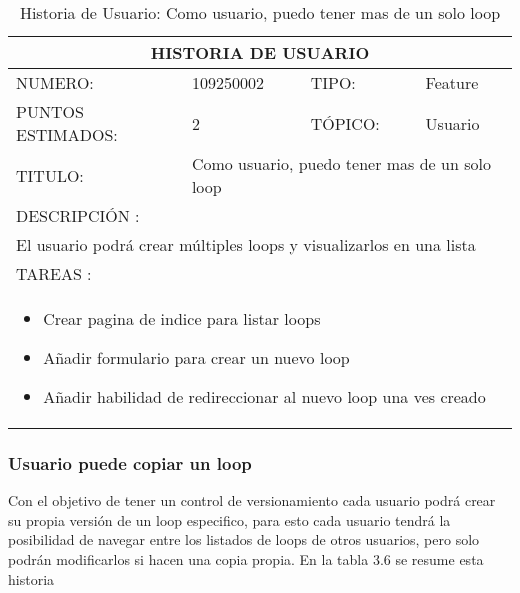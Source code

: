 \begin{table}[h]
\centering
\renewcommand{\arraystretch}{1.4}
\begin{tabular}{|*{4}{l|}}
\hline
\multicolumn{4}{|c|}{HISTORIA DE USUARIO} \\ \hline
NUMERO: & 109250002 & TIPO: & Feature \\ \hline
PUNTOS ESTIMADOS: & 2 & TÓPICO: & Usuario \\ \hline
TITULO: & \multicolumn{3}{|p{7.2cm}|}{Como usuario, puedo tener mas de un solo loop} \\ \hline
\multicolumn{4}{|l|}{DESCRIPCIÓN : } \\ \hline
\multicolumn{4}{|p{11cm}|}{El usuario podrá crear múltiples loops y visualizarlos en una lista} \\ \hline
\multicolumn{4}{|l|}{TAREAS : } \\ \hline
\multicolumn{4}{|p{11cm}|}{
\begin{minipage}[t]{\hsize}
  \begin{itemize}
    \item Crear pagina de indice para listar loops
    \item Añadir formulario para crear un nuevo loop
    \item Añadir habilidad de redireccionar al nuevo loop una ves creado
  \end{itemize}
\end{minipage}
} \\ \hline
\end{tabular}
\caption{Historia de Usuario: Como usuario, puedo tener mas de un solo loop}
\label{tab:Primero}
\end{table}

\subsubsection{Usuario puede copiar un loop}

Con el objetivo de tener un control de versionamiento cada usuario podrá
crear su propia versión de un loop especifico, para esto cada usuario
tendrá la posibilidad de navegar entre los listados de loops de otros
usuarios, pero solo podrán modificarlos si hacen una copia propia. En
la tabla 3.6 se resume esta historia

